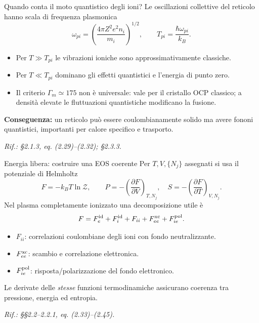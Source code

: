 \begin{frame}[t]{Quando conta il moto quantistico degli ioni?}
\small
Le oscillazioni collettive del reticolo hanno scala di frequenza plasmonica
\[
 \omega_{pi}=\left(\frac{4\pi Z^2e^2 n_i}{m_i}\right)^{1/2},\qquad
 T_{pi}=\frac{\hbar\omega_{pi}}{k_B}.
\]
\begin{itemize}
\item Per $T\gg T_{pi}$ le vibrazioni ioniche sono approssimativamente classiche.
\item Per $T\ll T_{pi}$ dominano gli effetti quantistici e l'energia di punto zero.
\item Il criterio $\Gamma_m\simeq175$ non è universale: vale per il cristallo OCP classico; a densità elevate le fluttuazioni quantistiche modificano la fusione.
\end{itemize}
\medskip
\textbf{Conseguenza:} un reticolo può essere coulombianamente solido ma avere fononi quantistici, importanti per calore specifico e trasporto.
\par\scriptsize\emph{Rif.: §2.1.3, eq. (2.29)--(2.32); §2.3.3.}
\end{frame}

\begin{frame}[t]{Energia libera: costruire una EOS coerente}
\small
Per $T,V,\{N_j\}$ assegnati si usa il potenziale di Helmholtz
\[
 F=-k_BT\ln\mathcal Z,\qquad
 P=-\left(\frac{\partial F}{\partial V}\right)_{T,N_j},\quad
 S=-\left(\frac{\partial F}{\partial T}\right)_{V,N_j}.
\]
Nel plasma completamente ionizzato una decomposizione utile è
\[
 F=F_e^{\rm id}+F_i^{\rm id}+F_{ii}+F_{ee}^{\rm xc}+F_{ie}^{\rm pol}.
\]
\begin{itemize}
\item $F_{ii}$: correlazioni coulombiane degli ioni con fondo neutralizzante.
\item $F_{ee}^{\rm xc}$: scambio e correlazione elettronica.
\item $F_{ie}^{\rm pol}$: risposta/polarizzazione del fondo elettronico.
\end{itemize}
Le derivate delle \emph{stesse} funzioni termodinamiche assicurano coerenza tra pressione, energia ed entropia.
\par\scriptsize\emph{Rif.: §§2.2--2.2.1, eq. (2.33)--(2.45).}
\end{frame}

